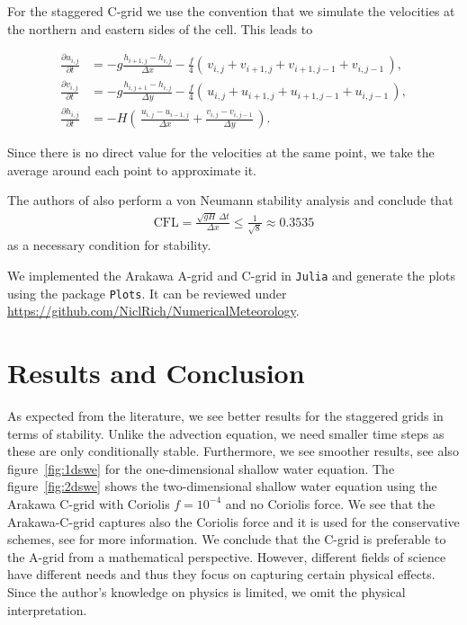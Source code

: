 For the staggered C-grid we use the convention that we simulate the velocities at the 
northern and eastern sides of the cell. This leads to 

\begin{align}
    \label{eq:Cgrid}
    \frac{\partial u_{i,j}}{\partial t} &= -g \frac{h_{i+1,j }- h_{i,j}}{\Delta x} - \frac{f}{4}
    \left(\,v_{i,j} + v_{i+1,j} + v_{i+1, j-1} + v_{i,j-1}\, \right), \\[1em]
    \frac{\partial v_{i,j}}{\partial t} &= -g \frac{h_{i,j+1} - h_{i,j}}{\Delta y} - \frac{f}{4}
    \left(\,u_{i,j} + u_{i+1,j} + u_{i+1, j-1} + u_{i,j-1}\, \right), \\[1em]
    \frac{\partial h_{i,j}}{\partial t} &= -H\left(\, \frac{u_{i,j} - u_{i-1, j}}{\Delta x} + \frac{v_{i,j} - v_{i, j-1}}{\Delta y}\, \right).
\end{align}


Since there is no direct value for the velocities at the same point, we take the average around 
each point to approximate it.

The authors of \cite{Doos2022} also perform a von Neumann stability analysis and conclude that
\begin{align*}
    \mathrm{CFL} = \frac{\sqrt{gH}\, \Delta t}{\Delta x} \leq \frac{1}{\sqrt{8}} \approx 0.3535
\end{align*}
as a necessary condition for stability.


We implemented the Arakawa A-grid and C-grid in \texttt{Julia} and generate the plots using the
package \texttt{Plots}. It can be reviewed under \url{https://github.com/NiclRich/NumericalMeteorology}.


\section{Results and Conclusion}

As expected from the literature, we see better results for the staggered grids in terms of 
stability. Unlike the advection equation, we need smaller time steps as these are only conditionally stable.
Furthermore, we see smoother results, see also figure~\cref{fig:1dswe} for the one-dimensional 
shallow water equation. The figure~\cref{fig:2dswe} shows the two-dimensional shallow water
equation using the Arakawa C-grid with Coriolis $f = 10^{-4}$ and no Coriolis force. We see that the
Arakawa-C-grid captures also the Coriolis force and it is used for the conservative schemes, see
\cite{Doos2022} for more information. We conclude that the C-grid is preferable to the A-grid from a
mathematical perspective. However, different fields of science have different needs and thus they focus 
on capturing certain physical effects. Since the author's knowledge on physics is limited, we omit
the physical interpretation.

